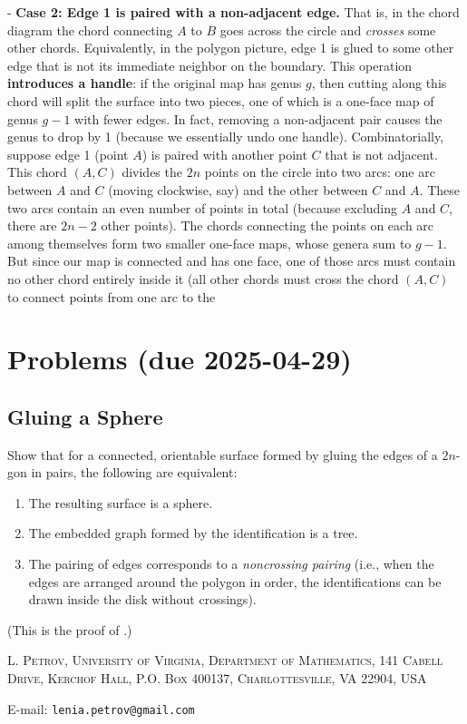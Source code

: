 \documentclass[letterpaper,11pt,oneside,reqno]{article}
\numberwithin{equation}{section}
\theoremstyle{definition}
\begin{document}
- \textbf{Case 2: Edge 1 is paired with a non-adjacent edge.} That is, in the chord diagram the chord connecting $A$ to $B$ goes across the circle and \emph{crosses} some other chords. Equivalently, in the polygon picture, edge 1 is glued to some other edge that is not its immediate neighbor on the boundary. This operation \textbf{introduces a handle}: if the original map has genus $g$, then cutting along this chord will split the surface into two pieces, one of which is a one-face map of genus $g-1$ with fewer edges. In fact, removing a non-adjacent pair causes the genus to drop by 1 (because we essentially undo one handle). Combinatorially, suppose edge 1 (point $A$) is paired with another point $C$ that is not adjacent. This chord $(A,C)$ divides the $2n$ points on the circle into two arcs: one arc between $A$ and $C$ (moving clockwise, say) and the other between $C$ and $A$. These two arcs contain an even number of points in total (because excluding $A$ and $C$, there are $2n-2$ other points). The chords connecting the points on each arc among themselves form two smaller one-face maps, whose genera sum to $g-1$. But since our map is connected and has one face, one of those arcs must contain no other chord entirely inside it (all other chords must cross the chord $(A,C)$ to connect points from one arc to the
























\appendix
\setcounter{section}{14}

\section{Problems (due 2025-04-29)}

\subsection{Gluing a Sphere}
\label{prob:gluing_sphere}
Show that for a connected, orientable surface formed by gluing the edges of a $2n$-gon in pairs, the following are equivalent:
\begin{enumerate}
	\item The resulting surface is a sphere.
	\item The embedded graph formed by the identification is a tree.
	\item The pairing of edges corresponds to a \emph{noncrossing pairing} (i.e., when the edges are arranged around the polygon in order, the identifications can be drawn inside the disk without crossings).
\end{enumerate}
(This is the proof of .)






\medskip

\textsc{L. Petrov, University of Virginia, Department of Mathematics, 141 Cabell Drive, Kerchof Hall, P.O. Box 400137, Charlottesville, VA 22904, USA}

E-mail: \texttt{lenia.petrov@gmail.com}
\end{document}
